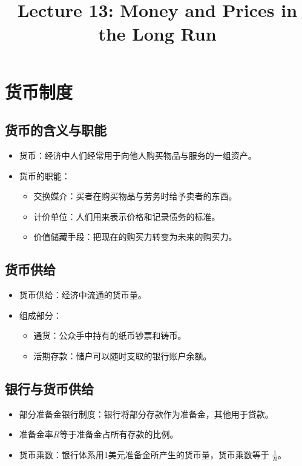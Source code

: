 \documentclass[12pt, a4paper]{article}
\title{Lecture 13: Money and Prices in the Long Run}
\author{}
\date{}
\begin{document}
\maketitle

\section{货币制度}

\subsection{货币的含义与职能}
\begin{itemize}
    \item 货币：经济中人们经常用于向他人购买物品与服务的一组资产。
    \item 货币的职能：
    \begin{itemize}
        \item 交换媒介：买者在购买物品与劳务时给予卖者的东西。
        \item 计价单位：人们用来表示价格和记录债务的标准。
        \item 价值储藏手段：把现在的购买力转变为未来的购买力。
    \end{itemize}
\end{itemize}

\subsection{货币供给}
\begin{itemize}
    \item 货币供给：经济中流通的货币量。
    \item 组成部分：
    \begin{itemize}
        \item 通货：公众手中持有的纸币钞票和铸币。
        \item 活期存款：储户可以随时支取的银行账户余额。
    \end{itemize}
\end{itemize}

\subsection{银行与货币供给}
\begin{itemize}
    \item 部分准备金银行制度：银行将部分存款作为准备金，其他用于贷款。
    \item 准备金率\( R \)等于准备金占所有存款的比例。
    \item 货币乘数：银行体系用1美元准备金所产生的货币量，货币乘数等于 \( \frac{1}{R} \)。
\end{itemize}
\end{document}
